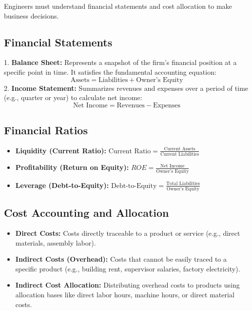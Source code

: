 \documentclass[12pt,a4paper]{article}
\begin{document}
Engineers must understand financial statements and cost allocation to make business decisions.

\subsection{Financial Statements}
1.  \textbf{Balance Sheet:} Represents a snapshot of the firm's financial position at a specific point in time. It satisfies the fundamental accounting equation:
    \begin{equation}
      \text{Assets} = \text{Liabilities} + \text{Owner's Equity}
    \end{equation}
2.  \textbf{Income Statement:} Summarizes revenues and expenses over a period of time (e.g., quarter or year) to calculate net income:
    \begin{equation}
      \text{Net Income} = \text{Revenues} - \text{Expenses}
    \end{equation}

\subsection{Financial Ratios}
\begin{itemize}[leftmargin=*, itemsep=6pt]
  \item \textbf{Liquidity (Current Ratio):} $\text{Current Ratio} = \displaystyle\frac{\text{Current Assets}}{\text{Current Liabilities}}$
  \item \textbf{Profitability (Return on Equity):} $ROE = \displaystyle\frac{\text{Net Income}}{\text{Owner's Equity}}$
  \item \textbf{Leverage (Debt-to-Equity):} $\text{Debt-to-Equity} = \displaystyle\frac{\text{Total Liabilities}}{\text{Owner's Equity}}$
\end{itemize}

\subsection{Cost Accounting and Allocation}
\begin{itemize}[leftmargin=*, itemsep=4pt]
  \item \textbf{Direct Costs:} Costs directly traceable to a product or service (e.g., direct materials, assembly labor).
  \item \textbf{Indirect Costs (Overhead):} Costs that cannot be easily traced to a specific product (e.g., building rent, supervisor salaries, factory electricity).
  \item \textbf{Indirect Cost Allocation:} Distributing overhead costs to products using allocation bases like direct labor hours, machine hours, or direct material costs.
\end{itemize}
\end{document}
